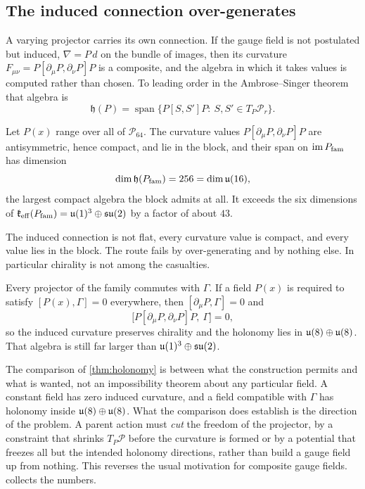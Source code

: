 \subsection{The induced connection over-generates}

A varying projector carries its own connection. If the gauge field is not postulated but induced, $\nabla=P\,d$ on the bundle of
images, then its curvature $F_{\mu\nu}=P[\partial_\mu P,\partial_\nu P]P$ is a composite, and the algebra in which it takes values is
computed rather than chosen. To leading order in the Ambrose--Singer theorem that algebra is
\[
\mathfrak h(P)=\operatorname{span}\bigl\{P[S,S']P:\ S,S'\in T_P\mathcal P_r\bigr\}.
\]

\begin{theorem}
\label{thm:holonomy}
Let $P(x)$ range over all of $\mathcal P_{64}$. The curvature values $P[\partial_\mu P,\partial_\nu P]P$ are antisymmetric, hence
compact, and lie in the block, and their span on $\operatorname{im}P_{\rm fam}$ has dimension
\[
\dim\mathfrak h(P_{\rm fam})=256=\dim\mathfrak{u}(16),
\]
the largest compact algebra the block admits at all. It exceeds the six dimensions of $\mathfrak k_{\rm eff}(P_{\rm fam})=\mathfrak{u}(1)^3\oplus\mathfrak{su}(2)$ by a factor
of about $43$.
\end{theorem}

The induced connection is not flat, every curvature value is compact, and every value lies in the block. The route fails by
over-generating and by nothing else. In particular chirality is not among the casualties.

\begin{proposition}
\label{prop:chiralpreserved}
Every projector of the family commutes with $\Gamma$. If a field $P(x)$ is required to satisfy $[P(x),\Gamma]=0$ everywhere, then
$[\partial_\mu P,\Gamma]=0$ and
\[
\bigl[P[\partial_\mu P,\partial_\nu P]P,\ \Gamma\bigr]=0 ,
\]
so the induced curvature preserves chirality and the holonomy lies in $\mathfrak{u}(8)\oplus\mathfrak{u}(8)$. That algebra is still far larger than
$\mathfrak{u}(1)^3\oplus\mathfrak{su}(2)$.
\end{proposition}

The comparison of \cref{thm:holonomy} is between what the construction permits and what is wanted, not an impossibility theorem
about any particular field. A constant field has zero induced curvature, and a field compatible with $\Gamma$ has holonomy inside
$\mathfrak{u}(8)\oplus\mathfrak{u}(8)$. What the comparison does establish is the direction of the problem. A parent action must \emph{cut} the freedom of
the projector, by a constraint that shrinks $T_P\mathcal P$ before the curvature is formed or by a potential that freezes all but the
intended holonomy directions, rather than build a gauge field up from nothing. This reverses the usual motivation for composite
gauge fields.  collects the numbers.

